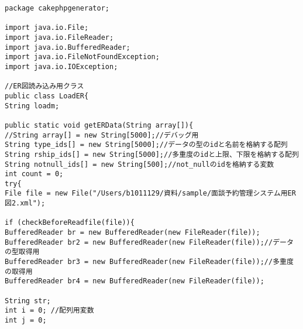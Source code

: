 \documentclass{funthesis}
\begin{document}
\begin{lstlisting}[caption=LoadER.java,label=1]
package cakephpgenerator;

import java.io.File;
import java.io.FileReader;
import java.io.BufferedReader;
import java.io.FileNotFoundException;
import java.io.IOException;

//ER図読み込み用クラス
public class LoadER{
String loadm;

public static void getERData(String array[]){
//String array[] = new String[5000];//デバッグ用
String type_ids[] = new String[5000];//データの型のidと名前を格納する配列
String rship_ids[] = new String[5000];//多重度のidと上限、下限を格納する配列
String notnull_ids[] = new String[500];//not_nullのidを格納する変数
int count = 0;
try{
File file = new File("/Users/b1011129/資料/sample/面談予約管理システム用ER図2.xml");

if (checkBeforeReadfile(file)){
BufferedReader br = new BufferedReader(new FileReader(file));
BufferedReader br2 = new BufferedReader(new FileReader(file));//データの型取得用
BufferedReader br3 = new BufferedReader(new FileReader(file));//多重度の取得用
BufferedReader br4 = new BufferedReader(new FileReader(file));

String str;
int i = 0; //配列用変数
int j = 0;



\end{lstlisting}
\end{document}
